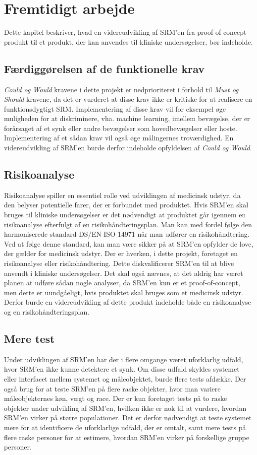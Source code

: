 \chapter{Fremtidigt arbejde}

Dette kapitel beskriver, hvad en videreudvikling af SRM'en fra proof-of-concept produkt til et produkt, der kan anvendes til kliniske undersøgelser, bør indeholde. 


\section{Færdiggørelsen af de funktionelle krav}
\textit{Could og Would} kravene i dette projekt er nedprioriteret i forhold til \textit{Must og Should} kravene, da det er vurderet at disse krav ikke er kritiske for at realisere en funktionsdygtigt SRM. Implementering af disse krav vil for eksempel øge muligheden for at diskriminere, vha. machine learning, imellem bevægelse, der er forårsaget af et synk eller andre bevægelser som hovedbevægelser eller hoste. Implementering af et sådan krav vil også øge målingernes troværdighed. En videreudvikling af SRM'en burde derfor indeholde opfyldelsen af \textit{Could og Would}.   
\section{Risikoanalyse}
 Risikoanalyse spiller en essentiel rolle ved udviklingen af medicinsk udstyr, da den belyser potentielle farer, der er forbundet med produktet. Hvis SRM'en skal bruges til kliniske undersøgelser er det nødvendigt at produktet går igennem en risikoanalyse efterfulgt af en risikohåndteringsplan. Man kan med fordel følge den harmoniserede standard DS/EN ISO 14971 når man udfører en risikohåndtering. Ved at følge denne standard, kan man være sikker på at SRM'en opfylder de love, der gælder for medicinsk udstyr. Der er hverken, i dette projekt, foretaget en risikoanalyse eller risikohåndtering. Dette diskvalificerer SRM'en til at blive anvendt i kliniske undersøgelser. Det skal også nævnes, at det aldrig har været planen at udføre sådan nogle analyser, da SRM'en kun er et proof-of-concept, men dette er uundgåeligt, hvis produktet skal bruges som et medicinsk udstyr. Derfor burde en videreudvikling af dette produkt indeholde både en risikoanalyse og en risikohåndteringsplan.     

\section{Mere test}
Under udviklingen af  SRM'en har der i flere omgange været uforklarlig udfald, hvor SRM'en ikke kunne detektere et synk. Om disse udfald skyldes systemet eller interfacet mellem systemet og måleobjektet, burde flere tests afdække. Der også brug for at teste SRM'en på flere raske objekter, hvor man variere måleobjekternes køn, vægt og race. Der er kun foretaget tests på to raske objekter under udvikling af SRM'en, hvilken ikke er nok til at vurdere, hvordan SRM'en virker på større populationer. Det er derfor nødvendigt at teste systemet mere for at identificere de uforklarlige udfald, der er omtalt, samt mere tests på flere raske personer for at estimere, hvordan SRM'en virker på forskellige gruppe personer.  
 
